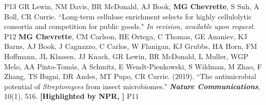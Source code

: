 \begin{cvpubs}
{    } %
    {P13} %
  \cvpub
    {GR Lewin, NM Davis, BR McDonald, AJ Book, \textbf{MG Chevrette}, S Suh, A Boll, CR Currie. ``Long-term cellulose enrichment selects for highly cellulolytic consortia and competition for public goods." \textit{In revision, available upon request}.
    } %
    {P12} %
  \cvpub
    {\textbf{MG Chevrette}, CM Carlson, HE Ortega, C Thomas, GE Ananiev, KJ Barns, AJ Book, J Cagnazzo, C Carlos, W Flanigan, KJ Grubbs, HA Horn, FM Hoffmann, JL Klassen, JJ Knack, GR Lewin, BR McDonald, L Muller, WGP Melo, AA Pinto-Tom\'{a}s, A Schmitz, E Wendt-Pienkowski, S Wildman, M Zhao, F Zhang, TS Bugni, DR Andes, MT Pupo, CR Currie. (2019). ``The antimicrobial potential of \textit{Streptomyces} from insect microbiomes." \textit{\textbf{Nature Communications}}, 10(1), 516. \textbf{\textit{}}
    \linebreak \textbf{[Highlighted by NPR, \textit{}]}
    } %
    {P11} %
\end{cvpubs}
